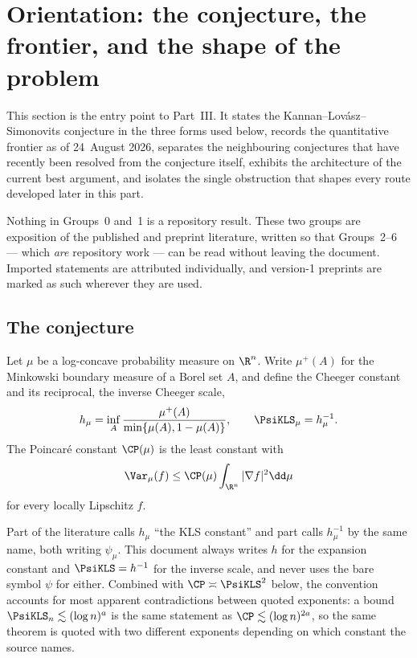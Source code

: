 \documentclass[../../main.tex]{subfiles}
\begin{document}
\section{Orientation: the conjecture, the frontier, and the shape of the problem}
\label{sec:kls-orientation}

This section is the entry point to Part~III. It states the Kannan--Lov\'asz--Simonovits
conjecture in the three forms used below, records the quantitative frontier as of
24~August 2026, separates the neighbouring conjectures that have recently been resolved from
the conjecture itself, exhibits the architecture of the current best argument, and isolates the
single obstruction that shapes every route developed later in this part.

Nothing in Groups~0 and~1 is a repository result. These two groups are exposition of the
published and preprint literature, written so that Groups~2--6 --- which \emph{are} repository
work --- can be read without leaving the document. Imported statements are attributed
individually, and version-1 preprints are marked as such wherever they are used.

\subsection{The conjecture}
\label{subsec:kls-conjecture}

Let $\mu$ be a log-concave probability measure on $\R^n$. Write $\mu^+(A)$ for the Minkowski
boundary measure of a Borel set $A$, and define the Cheeger constant and its reciprocal, the
inverse Cheeger scale,
\[
  h_\mu=\inf_{A}\frac{\mu^+(A)}{\min\{\mu(A),1-\mu(A)\}},
  \qquad
  \PsiKLS_\mu=h_\mu^{-1}.
\]
The Poincar\'e constant $\CP(\mu)$ is the least constant with
\[
  \Var_\mu(f)\le\CP(\mu)\int_{\R^n}|\nabla f|^2\dd\mu
\]
for every locally Lipschitz $f$.

\begin{warning}
\label{rem:psi-convention}
Part of the literature calls $h_\mu$ ``the KLS constant'' and part calls $h_\mu^{-1}$ by the same
name, both writing $\psi_\mu$. This document always writes $h$ for the expansion constant and
$\PsiKLS=h^{-1}$ for the inverse scale, and never uses the bare symbol $\psi$ for either.
Combined with $\CP\asymp\PsiKLS^2$ below, the convention accounts for most apparent
contradictions between quoted exponents: a bound $\PsiKLS_n\lesssim(\log n)^{a}$ is the same
statement as $\CP\lesssim(\log n)^{2a}$, so the same theorem is quoted with two different
exponents depending on which constant the source names.
\end{warning}
\end{document}
